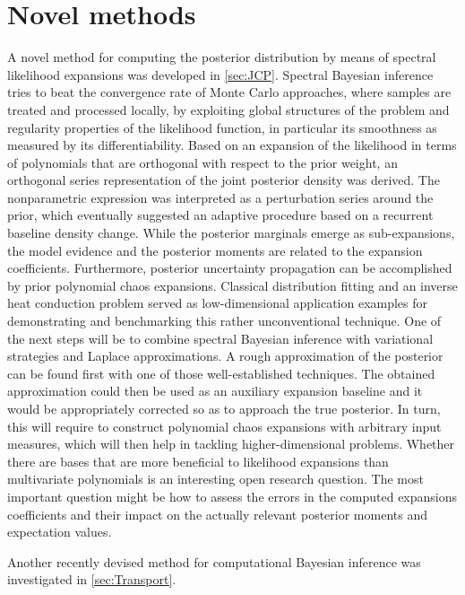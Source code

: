 \section{Novel methods}
A novel method for computing the posterior distribution by means of spectral likelihood expansions was developed in \cref{sec:JCP}.
Spectral Bayesian inference tries to beat the convergence rate of Monte Carlo approaches, where samples are treated and processed locally,
by exploiting global structures of the problem and regularity properties of the likelihood function, in particular its smoothness as measured by its differentiability.
Based on an expansion of the likelihood in terms of polynomials that are orthogonal with respect to the prior weight, an orthogonal series representation of the joint posterior density was derived.
The nonparametric expression was interpreted as a perturbation series around the prior, which eventually suggested an adaptive procedure based on a recurrent baseline density change.
While the posterior marginals emerge as sub-expansions, the model evidence and the posterior moments are related to the expansion coefficients.
Furthermore, posterior uncertainty propagation can be accomplished by prior polynomial chaos expansions.
Classical distribution fitting and an inverse heat conduction problem served as low-dimensional application examples for demonstrating and benchmarking this rather unconventional technique.
One of the next steps will be to combine spectral Bayesian inference with variational strategies and Laplace approximations.
A rough approximation of the posterior can be found first with one of those well-established techniques.
The obtained approximation could then be used as an auxiliary expansion baseline and it would be appropriately corrected so as to approach the true posterior.
In turn, this will require to construct polynomial chaos expansions with arbitrary input measures, which will then help in tackling higher-dimensional problems.
Whether there are bases that are more beneficial to likelihood expansions than multivariate polynomials is an interesting open research question.
The most important question might be how to assess the errors in the computed expansions coefficients and their impact on the actually relevant posterior moments and expectation values.
\par %
Another recently devised method for computational Bayesian inference was investigated in \cref{sec:Transport}.

